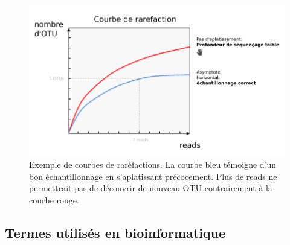 \documentclass[12pt,a4paper]{article}
\begin{document}
\begin{figure}[ht]
\begin{center}
\includegraphics[scale=0.5]{img/rarefaction_example.png}\hfill
\end{center}
\caption{Exemple de courbes de raréfactions. La courbe bleu témoigne d'un bon échantillonnage en s’aplatissant précocement. Plus de reads ne permettrait pas de découvrir de nouveau OTU contrairement à la courbe rouge. }
\label{rarefaction_demo}
\end{figure}




\subsection{Termes utilisés en bioinformatique}
\end{document}
